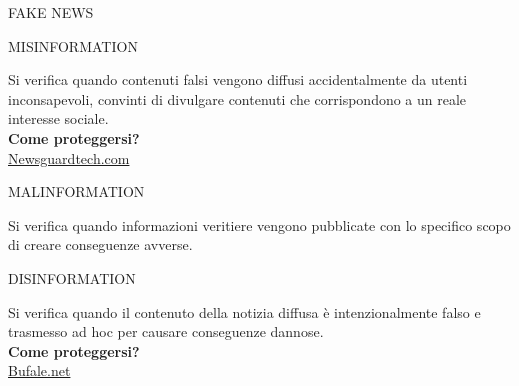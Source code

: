 \documentclass[aspectratio=1610]{beamer}
\begin{document}
\begin{frame}{FAKE NEWS}
    \begin{alertblock}{MISINFORMATION}
        \begin{minipage}{0.98\linewidth}
            \justifying
            Si verifica quando contenuti falsi vengono diffusi accidentalmente da 
            utenti inconsapevoli, convinti di divulgare contenuti che corrispondono 
            a un reale interesse sociale.\\
            \bigskip
            \tiny{\textbf{Come proteggersi?}}\\
            \tiny{\href{https://www.newsguardtech.com/it/}{Newsguardtech.com}}\\
        \end{minipage}
    \end{alertblock}
    \pause
    \begin{alertblock}{MALINFORMATION}
        \begin{minipage}{0.98\linewidth}
            \justifying
            Si verifica quando informazioni veritiere vengono pubblicate 
            con lo specifico scopo di creare conseguenze avverse.
        \end{minipage}
    \end{alertblock}
    \pause
    \begin{alertblock}{DISINFORMATION}
        \begin{minipage}{0.98\linewidth}
            \justifying
            Si verifica quando il contenuto della notizia diffusa è 
            intenzionalmente falso e trasmesso ad hoc per causare conseguenze dannose.\\
            \bigskip
            \tiny{\textbf{Come proteggersi?}}\\
            \tiny{\href{https://www.bufale.net/}{Bufale.net}}\\
        \end{minipage}
    \end{alertblock}
\end{frame}
\end{document}
